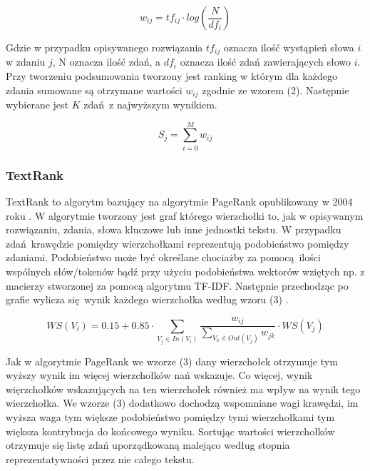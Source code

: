 \documentclass{article}
\begin{document}
\begin{center}
	\begin{equation}
		w_{ij} = tf_{ij} \cdot log(\frac{N}{df_i})
	\end{equation}
\end{center}

Gdzie w przypadku opisywanego rozwiązania $tf_{ij}$ oznacza ilość wystąpień słowa
$i$ w zdaniu $j$, N oznacza ilość zdań, a $df_i$ oznacza ilość zdań zawierających
słowo $i$. 
Przy tworzeniu podsumowania tworzony jest ranking w którym dla każdego zdania sumowane
są otrzymane wartości $w_{ij}$ zgodnie ze wzorem (2). Następnie wybierane jest $K$ 
zdań z najwyższym wynikiem.

\begin{center}
	\begin{equation}
		S_{j} = \sum_{i = 0}^{M} w_{ij}
	\end{equation}
\end{center}

\subsubsection{TextRank}
TextRank to algorytm bazujący na algorytmie PageRank opublikowany w 2004 roku \cite{mihalcea2004textrank}.
W algorytmie tworzony jest graf którego wierzchołki to, jak w opisywanym rozwiązaniu, zdania, słowa
kluczowe lub inne jednostki tekstu. W przypadku zdań krawędzie pomiędzy wierzchołkami reprezentują 
podobieństwo pomiędzy zdaniami. Podobieństwo może być określane chociażby za pomocą ilości wspólnych
słów/tokenów bądź przy użyciu podobieństwa wektorów wziętych np. z macierzy stworzonej za pomocą
algorytmu TF-IDF. Następnie przechodząc po grafie wylicza się wynik każdego wierzchołka według wzoru (3) \cite{mihalcea2004textrank}.

\begin{center}
	\begin{equation}
		WS(V_i) = 0.15 + 0.85 \cdot \sum_{V_j\in In(V_i)}^{} \frac{w_{ij}}{\sum_{V_k\in Out(V_j)}^{} w_{jk}} \cdot WS(V_j)
	\end{equation}
\end{center}

Jak w algorytmie PageRank we wzorze (3) dany wierzchołek otrzymuje tym wyższy wynik im więcej
wierzchołków nań wskazuje. Co więcej, wynik więrzchołków wskazujących na ten wierzchołek również
ma wpływ na wynik tego wierzchołka. We wzorze (3) dodatkowo dochodzą wspomniane wagi krawędzi, 
im wyższa waga tym większe podobieństwo pomiędzy tymi wierzchołkami tym większa kontrybucja 
do końcowego wyniku. Sortując wartości wierzchołków otrzymuje się listę zdań uporządkowaną malejąco
według stopnia reprezentatywności przez nie całego tekstu.
\end{document}
